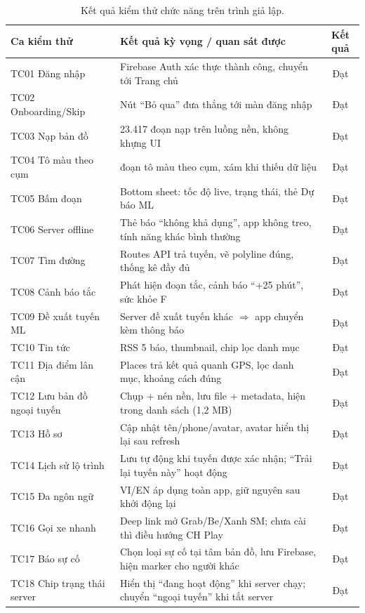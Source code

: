 \begin{table}[h!]
\centering
\caption{Kết quả kiểm thử chức năng trên trình giả lập.}
\label{tab:test}
\small
\begin{tabularx}{\textwidth}{p{4.4cm}Xc}
\toprule
\textbf{Ca kiểm thử} & \textbf{Kết quả kỳ vọng / quan sát được} & \textbf{Kết quả}\\
\midrule
TC01 Đăng nhập & Firebase Auth xác thực thành công, chuyển tới Trang chủ & Đạt\\
TC02 Onboarding/Skip & Nút ``Bỏ qua'' đưa thẳng tới màn đăng nhập & Đạt\\
TC03 Nạp bản đồ & 23.417 đoạn nạp trên luồng nền, không khựng UI & Đạt\\
TC04 Tô màu theo cụm & đoạn tô màu theo cụm, xám khi thiếu dữ liệu & Đạt\\
TC05 Bấm đoạn & Bottom sheet: tốc độ live, trạng thái, thẻ Dự báo ML & Đạt\\
TC06 Server offline & Thẻ báo ``không khả dụng'', app không treo, tính năng khác bình thường & Đạt\\
TC07 Tìm đường & Routes API trả tuyến, vẽ polyline đúng, thống kê đầy đủ & Đạt\\
TC08 Cảnh báo tắc & Phát hiện đoạn tắc, cảnh báo ``+25 phút'', sức khỏe F & Đạt\\
TC09 Đề xuất tuyến ML & Server đề xuất tuyến khác $\Rightarrow$ app chuyển kèm thông báo & Đạt\\
TC10 Tin tức & RSS 5 báo, thumbnail, chip lọc danh mục & Đạt\\
TC11 Địa điểm lân cận & Places trả kết quả quanh GPS, lọc danh mục, khoảng cách đúng & Đạt\\
TC12 Lưu bản đồ ngoại tuyến & Chụp + nén nền, lưu file + metadata, hiện trong danh sách (1,2 MB) & Đạt\\
TC13 Hồ sơ & Cập nhật tên/phone/avatar, avatar hiển thị lại sau refresh & Đạt\\
TC14 Lịch sử lộ trình & Lưu tự động khi tuyến được xác nhận; ``Trải lại tuyến này'' hoạt động & Đạt\\
TC15 Đa ngôn ngữ & VI/EN áp dụng toàn app, giữ nguyên sau khởi động lại & Đạt\\
TC16 Gọi xe nhanh & Deep link mở Grab/Be/Xanh SM; chưa cài thì điều hướng CH Play & Đạt\\
TC17 Báo sự cố & Chọn loại sự cố tại tâm bản đồ, lưu Firebase, hiện marker cho người khác & Đạt\\
TC18 Chip trạng thái server & Hiển thị ``đang hoạt động'' khi server chạy; chuyển ``ngoại tuyến'' khi tắt server & Đạt\\
\bottomrule
\end{tabularx}
\end{table}

